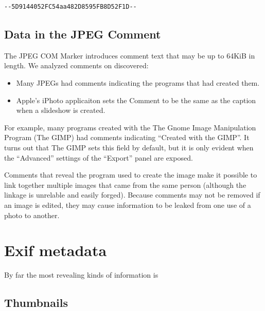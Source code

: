 \begin{lstlisting}[caption={A 40-character block of text consisting of
    two dashes, a 128-bit string (32 hexadecimal
    numbers), two more dashes, a carriage return and a line feed were
    found at the end of every photo taken with a Nokia Lumia 822
    cellular phone. Is this a serial number?},label=lumia822]
--5D9144052FC54aa482D8595FB8D52F1D--
\end{lstlisting}

\subsection{Data in the JPEG Comment}

The JPEG COM Marker introduces comment text that may be up to 64KiB in
length. We analyzed comments on discovered:

\begin{itemize}
\item Many JPEGs had comments indicating the programs that had created
  them. 
\item Apple's iPhoto applicaiton sets the Comment to be the same as
  the caption when a slideshow is created.
\end{itemize}

For example, many programs created with the The Gnome Image Manipulation
Program (The GIMP) had comments indicating ``Created with the
GIMP''. It turns out that The GIMP sets this field by default, but it
is only evident when the ``Advanced'' settings of the ``Export'' panel
are exposed.

Comments that reveal the program used to create the image make it
possible to link together multiple images that came from the same
person (although the linkage is unrelable and easily forged). Because
comments may not be removed if an image is edited, they may cause
information to be leaked from one use of a photo to another. 


\section{Exif metadata}\label{sec:exif}
By far the most revealing kinds of information is 

\subsection{Thumbnails}
